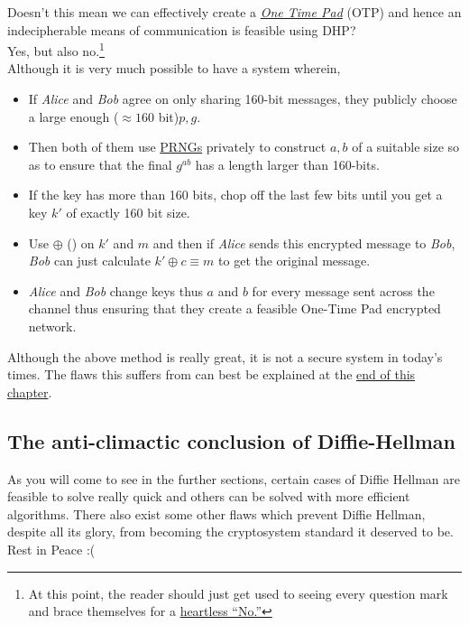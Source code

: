 		\centering{\Huge{\textcolor{orange}{But wait!}}} \par
		\raggedright \noindent Doesn't this mean we can effectively create a \emph{\hyperref[box:onetimepad]{One Time Pad}} (OTP) and hence an indecipherable means of communication is feasible using DHP? \\
		Yes, but also no.\footnote{At this point, the reader should just get used to seeing every question mark and brace themselves for a \hyperref[box:whyno]{heartless ``No.''}}\\
		Although it is very much possible to have a system wherein, 
		\begin{itemize}
			\item If \emph{Alice} and \emph{Bob} agree on only sharing 160-bit messages, they publicly choose a large enough (\(\approx 160\) bit)\(p, g\).
			\item Then both of them use \hyperref[subsec:prng]{PRNGs} privately to construct \(a, b\) of a suitable size so as to ensure that the final \(g^{ab}\) has a length larger than 160-bits.
			\item If the key has more than 160 bits, chop off the last few bits until you get a key \(k'\) of exactly 160 bit size.
			\item Use $\oplus$ () on \(k'\) and \(m\) and then if \emph{Alice} sends this encrypted message to \emph{Bob}, \emph{Bob} can just calculate \(k' \oplus c \equiv m\) to get the original message.
			\item \emph{Alice} and \emph{Bob} change keys thus \(a\) and \(b\) for every message sent across the channel thus ensuring that they create a feasible One-Time Pad encrypted network.
		\end{itemize}

		\begin{mybox}\label{box:whyno}
			Although the above method is really great, it is not a secure system in today's times. The flaws this suffers from can best be explained at the \hyperref[sec:whydiffiesucks]{end of this chapter}.
		\end{mybox}

		\subsection{The anti-climactic conclusion of Diffie-Hellman}
			As you will come to see in the further sections, certain cases of Diffie Hellman are feasible to solve really quick and others can be solved with more efficient algorithms. There also exist some other flaws which prevent Diffie Hellman, despite all its glory, from becoming the cryptosystem standard it deserved to be. Rest in Peace :(

